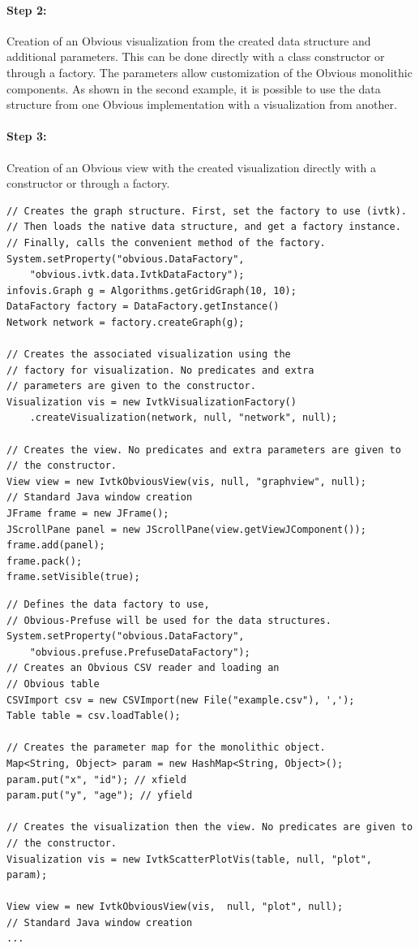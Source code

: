 \paragraph{Step 2:} Creation of an Obvious visualization from the
created data structure and additional parameters.  This can be done
directly with a class constructor or through a factory.  The
parameters allow customization of the Obvious monolithic components.
As shown in the second example, it is possible to use the data
structure from one Obvious implementation with a visualization from
another.

\paragraph{Step 3:} Creation of an Obvious view with the created
visualization directly with a constructor or through a factory.

\begin{lstlisting}[caption={Visualizing a graph with Obvious},label=codeSample1]
// Creates the graph structure. First, set the factory to use (ivtk).
// Then loads the native data structure, and get a factory instance.
// Finally, calls the convenient method of the factory.
System.setProperty("obvious.DataFactory",
    "obvious.ivtk.data.IvtkDataFactory");
infovis.Graph g = Algorithms.getGridGraph(10, 10);
DataFactory factory = DataFactory.getInstance()
Network network = factory.createGraph(g);

// Creates the associated visualization using the
// factory for visualization. No predicates and extra
// parameters are given to the constructor.
Visualization vis = new IvtkVisualizationFactory()
    .createVisualization(network, null, "network", null);

// Creates the view. No predicates and extra parameters are given to
// the constructor.
View view = new IvtkObviousView(vis, null, "graphview", null);
// Standard Java window creation
JFrame frame = new JFrame();
JScrollPane panel = new JScrollPane(view.getViewJComponent());
frame.add(panel);
frame.pack();
frame.setVisible(true);
\end{lstlisting}

\begin{lstlisting}[caption={Combining different Obvious implementations to display a scatter-plot},label=codeSample2]
// Defines the data factory to use,
// Obvious-Prefuse will be used for the data structures.
System.setProperty("obvious.DataFactory",
    "obvious.prefuse.PrefuseDataFactory");
// Creates an Obvious CSV reader and loading an
// Obvious table
CSVImport csv = new CSVImport(new File("example.csv"), ',');
Table table = csv.loadTable();

// Creates the parameter map for the monolithic object.
Map<String, Object> param = new HashMap<String, Object>();
param.put("x", "id"); // xfield
param.put("y", "age"); // yfield

// Creates the visualization then the view. No predicates are given to
// the constructor.
Visualization vis = new IvtkScatterPlotVis(table, null, "plot", param);

View view = new IvtkObviousView(vis,  null, "plot", null);
// Standard Java window creation
...
\end{lstlisting}

